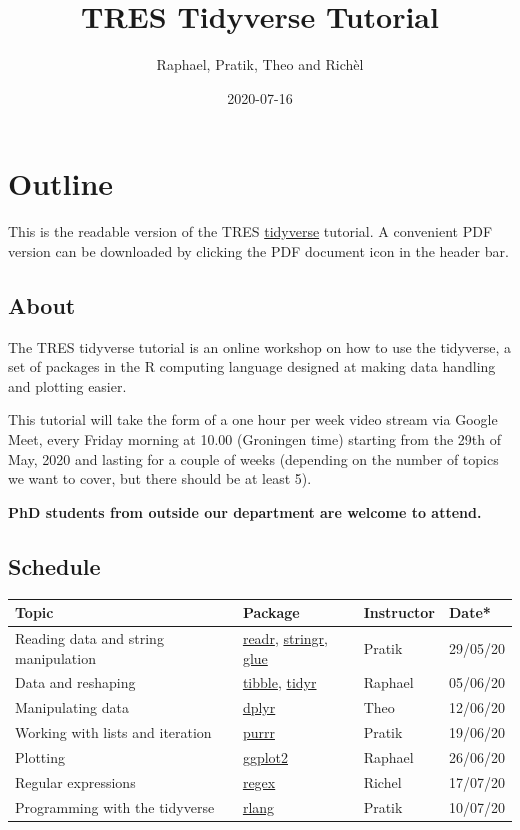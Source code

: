 \documentclass[]{book}
\title{TRES Tidyverse Tutorial}
\author{Raphael, Pratik, Theo and Richèl}
\date{2020-07-16}
\begin{document}
\maketitle


\linenumbers

{
\setcounter{tocdepth}{1}
\tableofcontents
}
\hypertarget{outline}{%
\chapter*{Outline}\label{outline}}

This is the readable version of the TRES \href{https://www.tidyverse.org/}{tidyverse} tutorial. A convenient PDF version can be downloaded by clicking the PDF document icon in the header bar.

\hypertarget{about}{%
\section*{About}\label{about}}

The TRES tidyverse tutorial is an online workshop on how to use the tidyverse, a set of packages in the R computing language designed at making data handling and plotting easier.

This tutorial will take the form of a one hour per week video stream via Google Meet, every Friday morning at 10.00 (Groningen time) starting from the 29th of May, 2020 and lasting for a couple of weeks (depending on the number of topics we want to cover, but there should be at least 5).

\textbf{PhD students from outside our department are welcome to attend.}

\hypertarget{schedule}{%
\section*{Schedule}\label{schedule}}

\begin{longtable}[]{@{}llll@{}}
\toprule
Topic & Package & Instructor & Date*\tabularnewline
\midrule
\endhead
Reading data and string manipulation & \href{https://readr.tidyverse.org/}{readr}, \href{https://stringr.tidyverse.org/}{stringr}, \href{https://github.com/tidyverse/glue}{glue} & Pratik & 29/05/20\tabularnewline
Data and reshaping & \href{https://tibble.tidyverse.org/}{tibble}, \href{https://tidyr.tidyverse.org/}{tidyr} & Raphael & 05/06/20\tabularnewline
Manipulating data & \href{https://dplyr.tidyverse.org/}{dplyr} & Theo & 12/06/20\tabularnewline
Working with lists and iteration & \href{https://purrr.tidyverse.org/}{purrr} & Pratik & 19/06/20\tabularnewline
Plotting & \href{https://ggplot2.tidyverse.org/}{ggplot2} & Raphael & 26/06/20\tabularnewline
Regular expressions & \href{https://stat.ethz.ch/R-manual/R-devel/library/base/html/regex.html}{regex} & Richel & 17/07/20\tabularnewline
Programming with the tidyverse & \href{https://rlang.r-lib.org/}{rlang} & Pratik & 10/07/20\tabularnewline
\bottomrule
\end{longtable}
\end{document}
